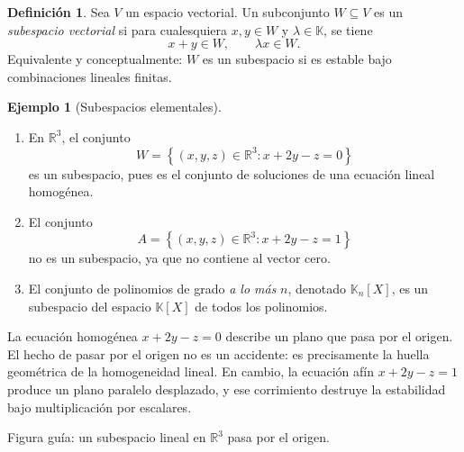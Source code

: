 \documentclass[10pt,a4paper,oneside]{article}
\theoremstyle{plain}
\theoremstyle{definition}
\newtheorem{definition}[theorem]{Definición}
\newtheorem{example}[theorem]{Ejemplo}
\theoremstyle{remark}
\newcommand{\K}{\mathbb{K}}
\newcommand{\R}{\mathbb{R}}
\newcommand{\set}[1]{\left\{ #1 \right\}}
\begin{document}
\begin{definition}
Sea \(V\) un espacio vectorial. Un subconjunto \(W\subseteq V\) es un \emph{subespacio vectorial} si para cualesquiera \(x,y\in W\) y \(\lambda\in\K\), se tiene
\[
x+y\in W,\qquad \lambda x\in W.
\]
Equivalente y conceptualmente: \(W\) es un subespacio si es estable bajo combinaciones lineales finitas.
\end{definition}

\begin{example}[Subespacios elementales]
\begin{enumerate}[label=\textup{(\alph*)}]
\item En \(\R^3\), el conjunto
\[
W=\set{(x,y,z)\in\R^3: x+2y-z=0}
\]
es un subespacio, pues es el conjunto de soluciones de una ecuación lineal homogénea.
\item El conjunto
\[
A=\set{(x,y,z)\in\R^3: x+2y-z=1}
\]
no es un subespacio, ya que no contiene al vector cero.
\item El conjunto de polinomios de grado \emph{a lo más} \(n\), denotado \(\K_n[X]\), es un subespacio del espacio \(\K[X]\) de todos los polinomios.
\end{enumerate}
\end{example}

\begin{intuitionBox}
La ecuación homogénea \(x+2y-z=0\) describe un plano que pasa por el origen. El hecho de pasar por el origen no es un accidente: es precisamente la huella geométrica de la homogeneidad lineal. En cambio, la ecuación afín \(x+2y-z=1\) produce un plano paralelo desplazado, y ese corrimiento destruye la estabilidad bajo multiplicación por escalares.
\end{intuitionBox}

\begin{center}

{\small Figura guía: un subespacio lineal en \(\R^3\) pasa por el origen.}
\end{center}
\end{document}
